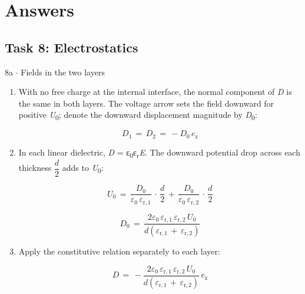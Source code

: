 \documentclass[11pt]{article}
\begin{document}
\section{Answers}
\begin{keepsection}\subsection{Task 8: Electrostatics}

\begin{workedbox}{8a \ensuremath{\cdot} Fields in the two layers}
\begin{enumerate}
\item {}
With no free charge at the internal interface, the normal component of \textit{D} is the same in both layers. The voltage arrow sets the field downward for positive \textit{U}\textsubscript{0}; denote the downward displacement magnitude by \textit{D}\textsubscript{0}:

\begin{equation*}{D}_{1}\, =\, {D}_{2}\, =\, -{D}_{0}\, {e}_{\mathrm{z}}\end{equation*}
\item {}
In each linear dielectric, \textit{D} = ε\textsubscript{0}ε\textsubscript{r}\textit{E}. The downward potential drop across each thickness {\small\ensuremath{\dfrac{{d}}{2}}} adds to \textit{U}\textsubscript{0}:

\begin{equation*}{U}_{0}\, =\, \dfrac{{D}_{0}}{ε_{0}\, ε_{\mathrm{r},1}}\, \cdot \, \dfrac{{d}}{2}\, +\, \dfrac{{D}_{0}}{ε_{0}\, ε_{\mathrm{r},2}}\, \cdot \, \dfrac{{d}}{2}\end{equation*}

\begin{equation*}{D}_{0}\, =\, \dfrac{2ε_{0}\, ε_{\mathrm{r},1}\, ε_{\mathrm{r},2}\, {U}_{0}}{{d}(ε_{\mathrm{r},1}\, +\, ε_{\mathrm{r},2})}\end{equation*}
\item {}
Apply the constitutive relation separately to each layer:

\begin{equation*}{D}\, =\, -\dfrac{2ε_{0}\, ε_{\mathrm{r},1}\, ε_{\mathrm{r},2}\, {U}_{0}}{{d}(ε_{\mathrm{r},1}\, +\, ε_{\mathrm{r},2})}\, {e}_{\mathrm{z}}\end{equation*}


\end{enumerate}
\end{workedbox}
\end{keepsection}
\end{document}
